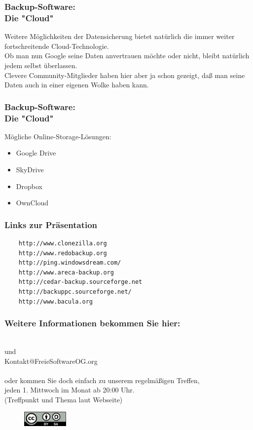 \begin{frame}
  \frametitle{Backup-Software:\\Die "Cloud"}
  \pause
  Weitere Möglichkeiten der Datensicherung bietet natürlich die immer weiter fortschreitende Cloud-Technologie.\\
  \pause
  Ob man nun Google seine Daten anvertrauen möchte oder nicht, bleibt natürlich jedem selbst überlassen.\\
  \pause
  Clevere Community-Mitglieder haben hier aber ja schon gezeigt, daß man seine Daten auch in einer eigenen Wolke haben kann.
\end{frame}

\begin{frame}
  \frametitle{Backup-Software:\\Die "Cloud"}
  Mögliche Online-Storage-Lösungen:
  \pause
  \begin{itemize}
    \item Google Drive
    \item SkyDrive
    \item Dropbox
    \item OwnCloud
  \end{itemize}
\end{frame}

\begin{frame}[fragile]   %
  \frametitle{Links zur Präsentation}
  \begin{verbatim}
    http://www.clonezilla.org
    http://www.redobackup.org
    http://ping.windowsdream.com/
    http://www.areca-backup.org
    http://cedar-backup.sourceforge.net
    http://backuppc.sourceforge.net/
    http://www.bacula.org
  \end{verbatim}
\end{frame}

\begin{frame}
\frametitle{Weitere Informationen bekommen Sie hier:}
  \begin{center}
  \Large{
    \fsog \\      %
    und \\
    Kontakt@FreieSoftwareOG.org \\~\\

    oder kommen Sie doch einfach zu unserem regelmäßigen Treffen, \\
    jeden 1. Mittwoch im Monat ab 20:00 Uhr. \\
    (Treffpunkt und Thema laut Webseite)
    }
  \end{center}
  \begin{figure}[ht]
    \centering
    \includegraphics[width=0.2\textwidth]{../gemeinsam/CC-BY-SA.png}
  \end{figure}  
\end{frame}



